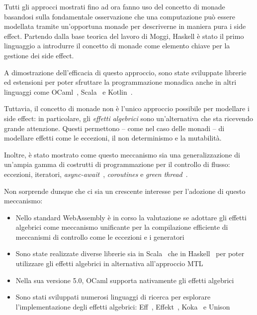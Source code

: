 Tutti gli approcci mostrati fino ad ora fanno uso del concetto di monade basandosi sulla fondamentale osservazione che una computazione può essere modellata tramite un'opportuna monade per descriverne in maniera pura i side effect.
Partendo dalla base teorica del lavoro di Moggi, Haskell è stato il primo linguaggio a introdurre il concetto di monade come elemento chiave per la gestione dei side effect.

A dimostrazione dell'efficacia di questo approccio, sono state sviluppate librerie ed estensioni per poter sfruttare la programmazione monadica anche in altri linguaggi come OCaml~\cite{cit:ppx-let}, Scala~\cite{cit:zio,cit:cats} e Kotlin~\cite{cit:arrow-monad-comprehensions}.

Tuttavia, il concetto di monade non è l'unico approccio possibile per modellare i side effect: in particolare, gli \emph{effetti algebrici} sono un'alternativa che sta ricevendo grande attenzione.
Questi permettono -- come nel caso delle monadi -- di modellare effetti come le eccezioni, il non determinismo e la mutabilità\cite{cit:handlers-of-algebraic-effects}.

Inoltre, è stato mostrato come questo meccanismo sia una generalizzazione di un'ampia gamma di costrutti di programmazione per il controllo di flusso: eccezioni, iteratori, \emph{async-await}~\cite{cit:structured-asynchrony-with-algebraic-effects}, \emph{coroutines} e \emph{green thread}~\cite{cit:algebraic-effect-handlers-go-mainstream}.

Non sorprende dunque che ci sia un crescente interesse per l'adozione di questo meccanismo:
\begin{itemize}
  \item Nello standard WebAssembly è in corso la valutazione se adottare gli effetti algebrici come meccanismo unificante per la compilazione efficiente di meccanismi di controllo come le eccezioni e i generatori~\cite{cit:wasmfx}
  \item Sono state realizzate diverse librerie sia in Scala~\cite{cit:scala-effekt} che in Haskell~\cite{cit:fused-effects,cit:effect-handlers,cit:extensible-effects} per poter utilizzare gli effetti algebrici in alternativa all'approccio MTL
  \item Nella sua versione 5.0, OCaml supporta nativamente gli effetti algebrici~\cite{cit:retrofitting-effect-handlers-onto-ocaml}
  \item Sono stati sviluppati numerosi linguaggi di ricerca per esplorare l'implementazione degli effetti algebrici: Eff~\cite{cit:eff-lang}, Effekt~\cite{cit:effekt-lang}, Koka~\cite{cit:koka-lang} e Unison~\cite{cit:unison-lang}
\end{itemize}
